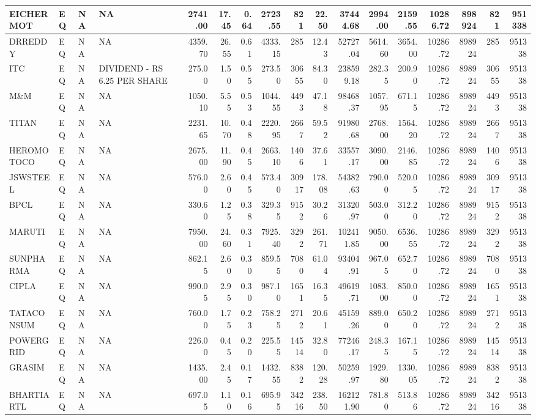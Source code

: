 \documentclass[
]{article}
\begin{document}
\begin{table}
\begin{tabular}{l|l|l|l|r|r|r|r|r|r|r|r|r|r|r|r|r}
\hline
EICHERMOT & EQ & NA & NA & 2741.00 & 17.45 & 0.64 & 2723.55 & 821 & 22.50 & 37444.68 & 2994.00 & 2159.55 & 10286.72 & 898924 & 821 & 951338\\
\hline
DRREDDY & EQ & NA & NA & 4359.70 & 26.55 & 0.61 & 4333.15 & 285 & 12.43 & 52727.04 & 5614.60 & 3654.00 & 10286.72 & 898924 & 285 & 951338\\
\hline
ITC & EQ & NA & DIVIDEND - RS 6.25 PER SHARE & 275.00 & 1.50 & 0.55 & 273.50 & 30655 & 84.30 & 238599.18 & 282.35 & 200.90 & 10286.72 & 898924 & 30655 & 951338\\
\hline
M\&M & EQ & NA & NA & 1050.10 & 5.55 & 0.53 & 1044.55 & 4493 & 47.18 & 98468.37 & 1057.95 & 671.15 & 10286.72 & 898924 & 4493 & 951338\\
\hline
TITAN & EQ & NA & NA & 2231.65 & 10.70 & 0.48 & 2220.95 & 2667 & 59.52 & 91980.68 & 2768.00 & 1564.20 & 10286.72 & 898924 & 2667 & 951338\\
\hline
HEROMOTOCO & EQ & NA & NA & 2675.00 & 11.90 & 0.45 & 2663.10 & 1406 & 37.61 & 33557.17 & 3090.00 & 2146.85 & 10286.72 & 898924 & 1406 & 951338\\
\hline
JSWSTEEL & EQ & NA & NA & 576.00 & 2.60 & 0.45 & 573.40 & 30917 & 178.08 & 54382.63 & 790.00 & 520.05 & 10286.72 & 898924 & 30917 & 951338\\
\hline
BPCL & EQ & NA & NA & 330.60 & 1.25 & 0.38 & 329.35 & 9152 & 30.26 & 31320.97 & 503.00 & 312.20 & 10286.72 & 898924 & 9152 & 951338\\
\hline
MARUTI & EQ & NA & NA & 7950.00 & 24.60 & 0.31 & 7925.40 & 3292 & 261.71 & 102411.85 & 9050.00 & 6536.55 & 10286.72 & 898924 & 3292 & 951338\\
\hline
SUNPHARMA & EQ & NA & NA & 862.15 & 2.60 & 0.30 & 859.55 & 7080 & 61.04 & 93404.91 & 967.05 & 652.70 & 10286.72 & 898924 & 7080 & 951338\\
\hline
CIPLA & EQ & NA & NA & 990.05 & 2.95 & 0.30 & 987.10 & 1651 & 16.35 & 49619.71 & 1083.00 & 850.00 & 10286.72 & 898924 & 1651 & 951338\\
\hline
TATACONSUM & EQ & NA & NA & 760.00 & 1.75 & 0.23 & 758.25 & 2712 & 20.61 & 45159.26 & 889.00 & 650.20 & 10286.72 & 898924 & 2712 & 951338\\
\hline
POWERGRID & EQ & NA & NA & 226.00 & 0.45 & 0.20 & 225.55 & 14514 & 32.80 & 77246.17 & 248.35 & 167.15 & 10286.72 & 898924 & 14514 & 951338\\
\hline
GRASIM & EQ & NA & NA & 1435.00 & 2.45 & 0.17 & 1432.55 & 8382 & 120.28 & 50259.97 & 1929.80 & 1330.05 & 10286.72 & 898924 & 8382 & 951338\\
\hline
BHARTIARTL & EQ & NA & NA & 697.05 & 1.10 & 0.16 & 695.95 & 34216 & 238.50 & 162121.90 & 781.80 & 513.86 & 10286.72 & 898924 & 34216 & 951338\\
\hline
\end{tabular}
\endgroup{}
\end{table}
\end{document}
